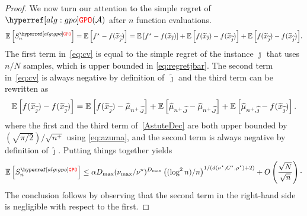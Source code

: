 \begin{proof}
We now turn our attention to the simple regret of $\GPO{}(\cA)$ after $n$ function evaluations.
\begin{equation}\label{eq:cv}
    \EE{S_n^{\GPO}} = \EE{f^\star - f(\tilde{x}_{\hat\jmath})} = \EE{f^\star - f(\tilde{x}_{\bar{\jmath}})} + \EE{f(\tilde{x}_{\bar{\jmath}}) - f(\tilde{x}_{\tilde{\jmath}})} + \EE{f(\tilde{x}_{\tilde{\jmath}}) - f(\tilde{x}_{\hat{\jmath}})}\!.
\end{equation}
The first term in~\eqref{eq:cv} is equal to the simple regret of the instance $\overline{\jmath}$ that uses $n/N$ samples, which is upper bounded in \eqref{eq:regretjbar}. The second term in~\eqref{eq:cv} is always negative by definition of~$\tilde{\jmath}$ and the third term can be rewritten as
\begin{equation}\label{AstuteDec}
    \mathbb{E}\left[f(\widetilde{x}_{\widetilde{\jmath}}) - f(\widetilde{x}_{\widehat{\jmath}})\right] = \mathbb{E}\left[f(\widetilde{x}_{\widetilde{\jmath}}) - \widehat{\mu}_{n^+,\widetilde{\jmath}}\right] + \mathbb{E}\left[\widehat{\mu}_{n^+,\widetilde{\jmath}} - \widehat{\mu}_{n^+,\widehat{\jmath}}\right] + \mathbb{E}\left[\widehat{\mu}_{n^+,\widehat{\jmath}} - f(\widetilde{x}_{\widehat{\jmath}})\right].
\end{equation}
where the first and the third term of~\eqref{AstuteDec} are both upper bounded by $(\sqrt{\pi/2})/\sqrt{n^+}$ using \eqref{eq:azuma}, and the second term is always negative by definition of $\hat{\jmath}$.
Putting things together yields 
\[    \EE{S_n^{\GPO}}  \leq \alpha D_{\max}(\nu_{\max}/\nu^\star)^{D_{\max}} \left( (\log^2 n)/n\right)^{1/(d(\nu^\star, C^\star,\rho^\star)+2)}+ O\left(\frac{\sqrt{N}}{\sqrt{n}}\right)\cdot\]
The conclusion follows by observing that the second term in the right-hand side is negligible with respect to the first. 
\end{proof}
